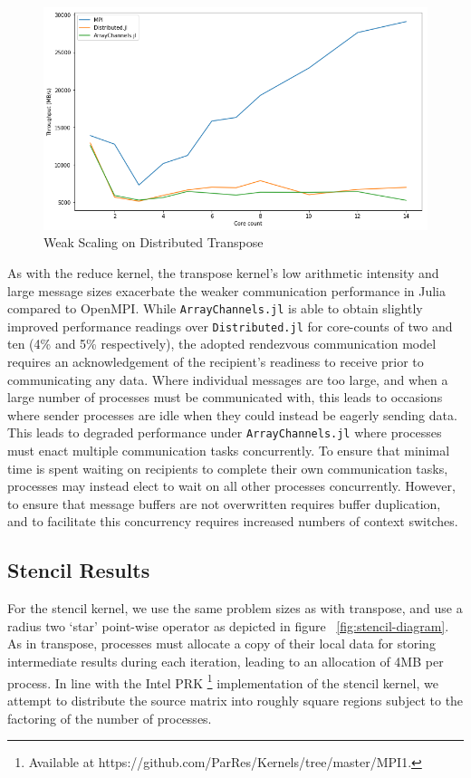 \documentclass{juliacon}
\begin{document}
\begin{figure}[htb]
	\includegraphics[width=\linewidth]{figs/transpose.png}
	\caption{Weak Scaling on Distributed Transpose}
	\label{fig:plot-transpose}
\end{figure}

As with the reduce kernel, the transpose kernel's low arithmetic
intensity and large message sizes exacerbate the weaker communication
performance in Julia compared to OpenMPI. While
\texttt{ArrayChannels.jl} is able to obtain slightly improved
performance readings over \texttt{Distributed.jl} for core-counts of two
and ten (4\% and 5\% respectively), the adopted rendezvous communication
model requires an acknowledgement of the recipient's readiness to
receive prior to communicating any data. Where individual messages are
too large, and when a large number of processes must be communicated
with, this leads to occasions where sender processes are idle when they
could instead be eagerly sending data. This leads to degraded
performance under \texttt{ArrayChannels.jl} where processes must enact
multiple communication tasks concurrently. To ensure that minimal time
is spent waiting on recipients to complete their own communication
tasks, processes may instead elect to wait on all other processes
concurrently. However, to ensure that message buffers are not
overwritten requires buffer duplication, and to facilitate this
concurrency requires increased numbers of context switches.

\subsection{Stencil Results}
\label{sec:stencil}

For the stencil kernel, we use the same problem sizes as with transpose,
and use a radius two `star' point-wise operator as depicted in figure
~\ref{fig:stencil-diagram}. As in transpose, processes must allocate a
copy of their local data for storing intermediate results during each
iteration, leading to an allocation of 4MB per process. In line with the
Intel PRK \footnote{Available at
	https://github.com/ParRes/Kernels/tree/master/MPI1.} implementation of
the stencil kernel, we attempt to distribute the source matrix into
roughly square regions subject to the factoring of the number of
processes.
\end{document}
